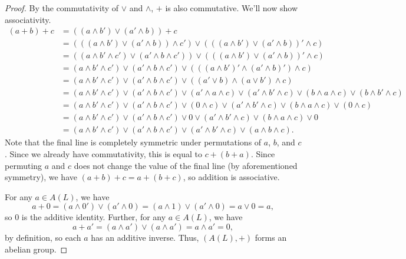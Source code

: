 \begin{proof}
By the commutativity of $\vee$ and $\wedge$, $+$ is also commutative. We'll now show associativity.
\begin{align*}
(a + b) + c &= ((a \wedge b') \vee (a' \wedge b)) + c \\
&= (((a \wedge b') \vee (a' \wedge b)) \wedge c') \vee (((a \wedge b') \vee (a' \wedge b))' \wedge c) \\
&= ((a \wedge b' \wedge c') \vee (a' \wedge b \wedge c')) \vee (((a \wedge b') \vee (a' \wedge b))' \wedge c) \\
&= (a \wedge b' \wedge c') \vee (a' \wedge b \wedge c') \vee (((a \wedge b')' \wedge (a' \wedge b)') \wedge c) \\
&= (a \wedge b' \wedge c') \vee (a' \wedge b \wedge c') \vee ((a' \vee b) \wedge (a \vee b') \wedge c) \\
&= (a \wedge b' \wedge c') \vee (a' \wedge b \wedge c') \vee (a' \wedge a \wedge c) \vee (a' \wedge b' \wedge c) \vee (b \wedge a \wedge c) \vee (b \wedge b' \wedge c) \\
&= (a \wedge b' \wedge c') \vee (a' \wedge b \wedge c') \vee (0 \wedge c) \vee (a' \wedge b' \wedge c) \vee (b \wedge a \wedge c) \vee (0 \wedge c) \\
&= (a \wedge b' \wedge c') \vee (a' \wedge b \wedge c') \vee 0 \vee (a' \wedge b' \wedge c) \vee (b \wedge a \wedge c) \vee 0 \\
&= (a \wedge b' \wedge c') \vee (a' \wedge b \wedge c') \vee (a' \wedge b' \wedge c) \vee (a \wedge b \wedge c).
\end{align*}
Note that the final line is completely symmetric under permutations of $a$, $b$, and $c$. Since we already have commutativity, this is equal to $c + (b + a)$. Since permuting $a$ and $c$ does not
change the value of the final line (by aforementioned symmetry), we have $(a + b) + c = a + (b + c)$, so addition is associative.

For any $a \in A(L)$, we have
$$a + 0 = (a \wedge 0') \vee (a' \wedge 0) = (a \wedge 1) \vee (a' \wedge 0) = a \vee 0 = a,$$
so $0$ is the additive identity. Further, for any $a \in A(L)$, we have
$$a + a' = (a \wedge a') \vee (a \wedge a') = a \wedge a' = 0,$$
by definition, so each $a$ has an additive inverse. Thus, $(A(L), +)$ forms an abelian group.


\end{proof}
